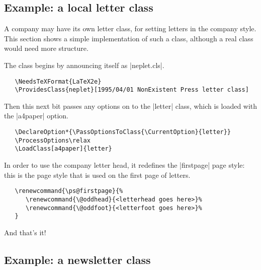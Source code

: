 \documentclass[11pt]{ltxguide}[1995/11/28]
\begin{document}
\subsection{Example: a local letter class}

A company may have its own letter class, for setting letters in the
company style.  This section shows a simple implementation of such a
class, although a real class would need more structure.

The class begins by announcing itself as |neplet.cls|.
\begin{verbatim}
   \NeedsTeXFormat{LaTeX2e}
   \ProvidesClass{neplet}[1995/04/01 NonExistent Press letter class]
\end{verbatim}
Then this next bit passes any options on to the |letter| class, which
is loaded with the |a4paper| option.
\begin{verbatim}
   \DeclareOption*{\PassOptionsToClass{\CurrentOption}{letter}}
   \ProcessOptions\relax
   \LoadClass[a4paper]{letter}
\end{verbatim}
In order to use the company letter head, it redefines the
|firstpage| page style: this is the page style that is used on
the first page of letters.
\begin{verbatim}
   \renewcommand{\ps@firstpage}{%
      \renewcommand{\@oddhead}{<letterhead goes here>}%
      \renewcommand{\@oddfoot}{<letterfoot goes here>}%
   }
\end{verbatim}
And that's it!

\subsection{Example: a newsletter class}
\end{document}
